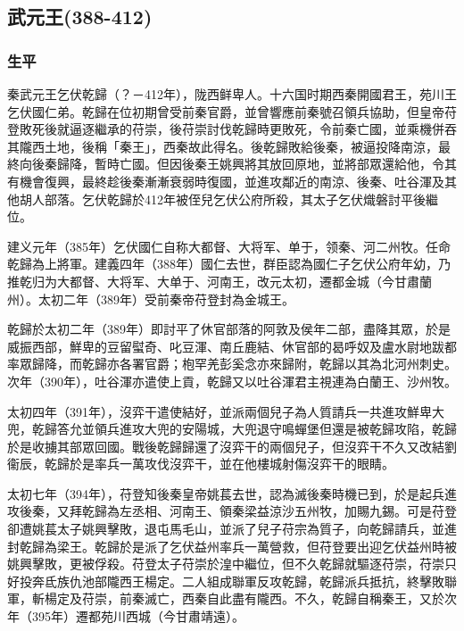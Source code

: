 
\subsection{武元王\tiny(388-412)}

\subsubsection{生平}

秦武元王乞伏乾歸（？－412年），陇西鲜卑人。十六国时期西秦開國君王，苑川王乞伏國仁弟。乾歸在位初期曾受前秦官爵，並曾響應前秦號召領兵協助，但皇帝苻登敗死後就逼逐繼承的苻崇，後苻崇討伐乾歸時更敗死，令前秦亡國，並乘機併吞其隴西土地，後稱「秦王」，西秦故此得名。後乾歸敗給後秦，被逼投降南涼，最終向後秦歸降，暫時亡國。但因後秦王姚興將其放回原地，並將部眾還給他，令其有機會復興，最終趁後秦漸漸衰弱時復國，並進攻鄰近的南涼、後秦、吐谷渾及其他胡人部落。乞伏乾歸於412年被侄兒乞伏公府所殺，其太子乞伏熾磐討平後繼位。

建义元年（385年）乞伏國仁自称大都督、大将军、单于，领秦、河二州牧。任命乾歸為上將軍。建義四年（388年）國仁去世，群臣認為國仁子乞伏公府年幼，乃推乾归为大都督、大将军、大单于、河南王，改元太初，遷都金城（今甘肅蘭州）。太初二年（389年）受前秦帝苻登封為金城王。

乾歸於太初二年（389年）即討平了休官部落的阿敦及侯年二部，盡降其眾，於是威振西部，鮮卑的豆留螱奇、叱豆渾、南丘鹿結、休官部的曷呼奴及盧水尉地跋都率眾歸降，而乾歸亦各署官爵；枹罕羌彭奚念亦來歸附，乾歸以其為北河州刺史。次年（390年），吐谷渾亦遣使上貢，乾歸又以吐谷渾君主視連為白蘭王、沙州牧。

太初四年（391年），沒弈干遣使結好，並派兩個兒子為人質請兵一共進攻鮮卑大兜，乾歸答允並領兵進攻大兜的安陽城，大兜退守鳴蟬堡但還是被乾歸攻陷，乾歸於是收擄其部眾回國。戰後乾歸歸還了沒弈干的兩個兒子，但沒弈干不久又改結劉衞辰，乾歸於是率兵一萬攻伐沒弈干，並在他樓城射傷沒弈干的眼睛。

太初七年（394年），苻登知後秦皇帝姚萇去世，認為滅後秦時機已到，於是起兵進攻後秦，又拜乾歸為左丞相、河南王、領秦梁益涼沙五州牧，加賜九錫。可是苻登卻遭姚萇太子姚興擊敗，退屯馬毛山，並派了兒子苻宗為質子，向乾歸請兵，並進封乾歸為梁王。乾歸於是派了乞伏益州率兵一萬營救，但苻登要出迎乞伏益州時被姚興擊敗，更被俘殺。苻登太子苻崇於湟中繼位，但不久乾歸就驅逐苻崇，苻崇只好投奔氐族仇池部隴西王楊定。二人組成聯軍反攻乾歸，乾歸派兵抵抗，終擊敗聯軍，斬楊定及苻崇，前秦滅亡，西秦自此盡有隴西。不久，乾歸自稱秦王，又於次年（395年）遷都苑川西城（今甘肅靖遠）。

